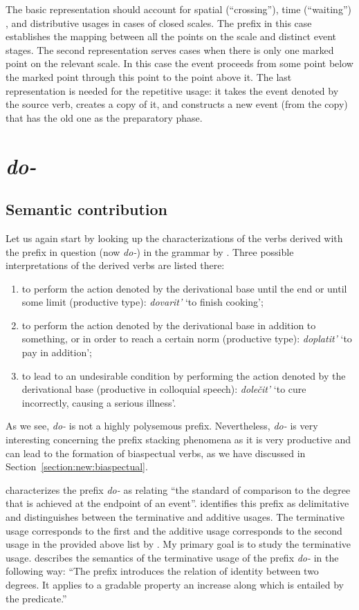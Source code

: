 The basic representation should account for spatial (``crossing''), time (``waiting'') , and distributive usages in cases of closed scales. The prefix in this case establishes the mapping between all the points on the scale and distinct event stages. The second representation serves cases when there is only one marked point on the relevant scale. In this case the event proceeds from some point below the marked point through this point to the point above it. The last representation is needed for the repetitive usage: it takes the event denoted by the source verb, creates a copy of it, and constructs a new event (from the copy) that has the old one as the preparatory phase.

\section{\textit{do-}}\label{subsection:semantics:do}
\subsection{Semantic contribution}
Let us again start by looking up the characterizations of the verbs derived with the prefix in question (now \textit{do-}) in the grammar by \citet[357--358]{Shvedova:82}. Three possible interpretations of the derived verbs are listed there:
\begin{enumerate}
\item to perform the action denoted by the derivational base until the end or until some limit (productive type): \textit{dovarit'} `to finish cooking';
\item to perform the action denoted by the derivational base in addition to something, or in order to reach a certain norm (productive type): \textit{doplatit'} `to pay in addition';
\item to lead to an undesirable condition by performing the action denoted by the derivational base (productive in colloquial speech): \textit{dole\v{c}it'} `to cure incorrectly, causing a serious illness'.
\end{enumerate}

As we see, \textit{do-} is not a highly polysemous prefix. Nevertheless, \textit{do-} is very interesting concerning the prefix stacking phenomena as it is very productive and can lead to the formation of biaspectual verbs, as we have discussed in Section~\ref{section:new:biaspectual}. 

\citet[70]{Kagan:book} characterizes the prefix \textit{do-} as relating ``the standard of comparison to the degree that is achieved at the endpoint of an event''. \citet{Kagan:book} identifies this prefix as delimitative and distinguishes between the terminative and additive  usages. The terminative usage corresponds to the first and the additive usage corresponds to the second usage in the provided above list by \citet{Shvedova:82}. My primary goal is to study the terminative usage. \citet[72]{Kagan:book} describes the semantics of the terminative usage of the prefix \textit{do-} in the following way: ``The prefix introduces the relation of identity between two degrees. It applies to a gradable property an increase along which is entailed by the predicate.''

